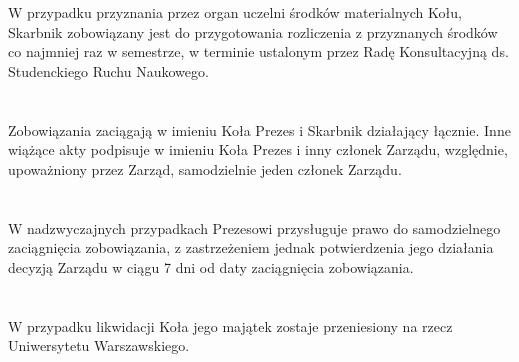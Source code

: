 \documentclass[a4paper]{article}
\begin{document}
\section{}
W przypadku przyznania przez organ uczelni środków materialnych Kołu, Skarbnik zobowiązany jest do przygotowania rozliczenia z przyznanych środków co najmniej raz w semestrze, w terminie ustalonym przez Radę Konsultacyjną ds. Studenckiego Ruchu Naukowego.

\section{}
Zobowiązania zaciągają w imieniu Koła Prezes i Skarbnik działający łącznie. Inne wiążące akty podpisuje w imieniu Koła Prezes i inny członek Zarządu, względnie, upoważniony przez Zarząd, samodzielnie jeden członek Zarządu.
 
\section{}
W nadzwyczajnych przypadkach Prezesowi przysługuje prawo do samodzielnego zaciągnięcia zobowiązania, z zastrzeżeniem jednak potwierdzenia jego działania decyzją Zarządu w ciągu 7 dni od daty zaciągnięcia zobowiązania.
 
\section{}
W przypadku likwidacji Koła jego majątek zostaje przeniesiony na rzecz Uniwersytetu Warszawskiego.
\end{document}
